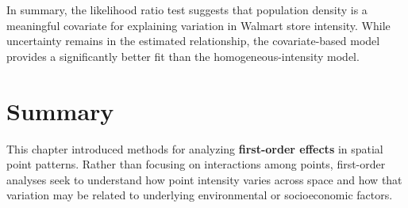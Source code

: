 \documentclass[
  letterpaper,
]{book}
\begin{document}
In summary, the likelihood ratio test suggests that population density
is a meaningful covariate for explaining variation in Walmart store
intensity. While uncertainty remains in the estimated relationship, the
covariate-based model provides a significantly better fit than the
homogeneous-intensity model.

\section{Summary}\label{summary-12}

This chapter introduced methods for analyzing \textbf{first-order
effects} in spatial point patterns. Rather than focusing on interactions
among points, first-order analyses seek to understand how point
intensity varies across space and how that variation may be related to
underlying environmental or socioeconomic factors.
\end{document}
